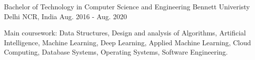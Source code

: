 

\begin{cventries}

  \cventry
    {Bachelor of Technology in Computer Science and Engineering} %
    {Bennett Univeristy} %
    {Delhi NCR, India} %
    {Aug. 2016 - Aug. 2020} %
    {
      \begin{cvitems} %
        \item {Main coursework: Data Structures, Design and analysis of Algorithms, Artiﬁcial Intelligence, Machine Learning, Deep Learning, Applied Machine Learning, Cloud Computing, Database Systems, Operating Systems, Software Engineering.}
      \end{cvitems}
    }

\end{cventries}

